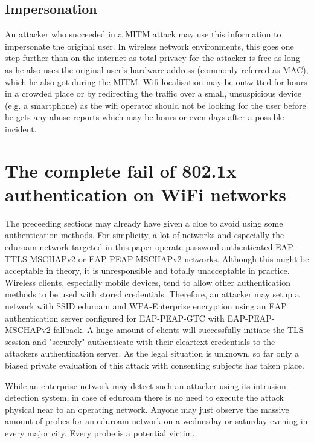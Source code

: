 \documentclass[12pt,a4paper]{scrartcl}
\begin{document}
\subsection{Impersonation}
An attacker who succeeded in a MITM attack may use this information to impersonate the original user.
In wireless network environments, this goes one step further than on the internet as total privacy for the attacker is free as long as he also uses the original user's hardware address (commonly referred as MAC), which he also got during the MITM.
Wifi localisation may be outwitted for hours in a crowded place or by redirecting the traffic over a small, unsuspicious device (e.g. a smartphone) as the wifi operator should not be looking for the user before he gets any abuse reports which may be hours or even days after a possible incident.


\section{The complete fail of 802.1x authentication on WiFi networks}
The preceeding sections may already have given a clue to avoid using some authentication methods.
For simplicity, a lot of networks and especially the eduroam network targeted in this paper operate password authenticated EAP-TTLS-MSCHAPv2 or EAP-PEAP-MSCHAPv2 networks.
Although this might be acceptable in theory, it is unresponsible and totally unacceptable in practice.
Wireless clients, especially mobile devices, tend to allow other authentication methods to be used with stored credentials.
Therefore, an attacker may setup a network with SSID eduroam and WPA-Enterprise encryption using an EAP authentication server configured for EAP-PEAP-GTC with EAP-PEAP-MSCHAPv2 fallback.
A huge amount of clients will successfully initiate the TLS session and "securely" authenticate with their cleartext credentials to the attackers authentication server.
As the legal situation is unknown, so far only a biased private evaluation of this attack with consenting subjects has taken place.

While an enterprise network may detect such an attacker using its intrusion detection system, in case of eduroam there is no need to execute the attack physical near to an operating network.
Anyone may just observe the massive amount of probes for an eduroam network on a wednesday or saturday evening in every major city.
Every probe is a potential victim.
\end{document}

